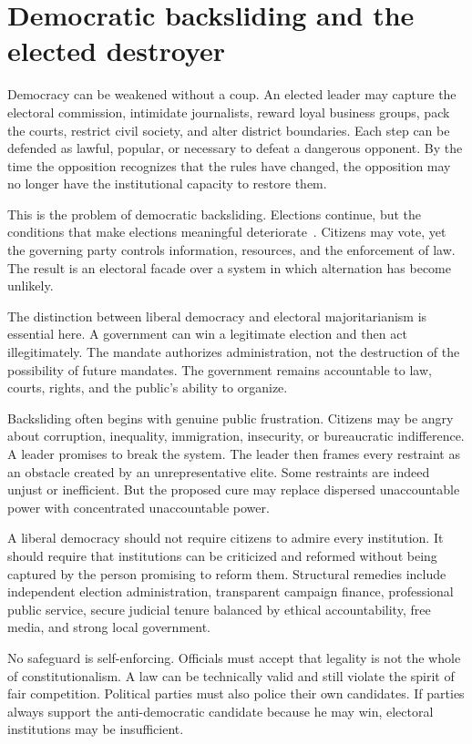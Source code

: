 ﻿\documentclass[12pt,a4paper]{book}
\begin{document}
\section{Democratic backsliding and the elected destroyer}

Democracy can be weakened without a coup.  An elected leader may capture the
electoral commission, intimidate journalists, reward loyal business groups,
pack the courts, restrict civil society, and alter district boundaries.  Each
step can be defended as lawful, popular, or necessary to defeat a dangerous
opponent.  By the time the opposition recognizes that the rules have changed,
the opposition may no longer have the institutional capacity to restore them.

This is the problem of democratic backsliding.  Elections continue, but the
conditions that make elections meaningful deteriorate~\cite{Diamond2019,HaggardKaufman2021}.
Citizens may vote,
yet the governing party controls information, resources, and the enforcement
of law.  The result is an electoral facade over a system in which alternation
has become unlikely.

The distinction between liberal democracy and electoral majoritarianism is
essential here.  A government can win a legitimate election and then act
illegitimately.  The mandate authorizes administration, not the destruction
of the possibility of future mandates.  The government remains accountable
to law, courts, rights, and the public's ability to organize.

Backsliding often begins with genuine public frustration.  Citizens may be
angry about corruption, inequality, immigration, insecurity, or bureaucratic
indifference.  A leader promises to break the system.  The leader then
frames every restraint as an obstacle created by an unrepresentative elite.
Some restraints are indeed unjust or inefficient.  But the proposed cure
may replace dispersed unaccountable power with concentrated unaccountable
power.

A liberal democracy should not require citizens to admire every institution.
It should require that institutions can be criticized and reformed without
being captured by the person promising to reform them.  Structural remedies
include independent election administration, transparent campaign finance,
professional public service, secure judicial tenure balanced by ethical
accountability, free media, and strong local government.

No safeguard is self-enforcing.  Officials must accept that legality is not
the whole of constitutionalism.  A law can be technically valid and still
violate the spirit of fair competition.  Political parties must also police
their own candidates.  If parties always support the anti-democratic
candidate because he may win, electoral institutions may be insufficient.
\end{document}
